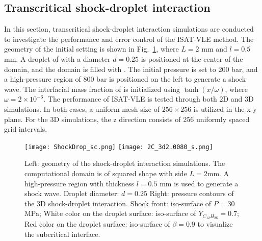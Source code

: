 \subsection{Transcritical shock-droplet interaction}
\label{sec:SD}

In this section, transcritical shock-droplet interaction simulations are conducted to investigate the performance and error control of the ISAT-VLE method. The geometry of the initial setting is shown in Fig.~\ref{SD_GEO}, where $L=2$ mm and $l=0.5$ mm. A droplet of  with a diameter $d=0.25$ is positioned at the center of the domain, and the domain is filled with . The initial pressure is set to 200 bar, and a high-pressure region of 800 bar is positioned on the left to generate a shock wave. The interfacial mass fraction of  is initialized using $\tanh(x/\omega)$, where $\omega=2 \times 10^{-6}$. The performance of ISAT-VLE is tested through both 2D and 3D simulations. In both cases, a uniform mesh size of $256\times256$ is utilized in the x-y plane. For the 3D simulations, the z direction consists of 256 uniformly spaced grid intervals. 


\begin{figure}[htbp]
\centering
\texttt{[image: ShockDrop\_sc.png]}
\hspace{.7in}
\texttt{[image: 2C\_3d2.0080\_s.png]}
\caption{Left: geometry of the shock-droplet interaction simulations. The computational domain is of squared shape with side $L=2$mm. A high-pressure region with thickness $l=0.5$ mm is used to generate a shock wave. Droplet diameter: $d=0.25$ Right: pressure contours of the 3D shock-droplet interaction. Shock front: iso-surface of $P=30$ MPa; White color on the droplet surface: iso-surface of $Y_{C_{12}H_{26}}=0.7$; Red color on the droplet surface: iso-surface of $\beta =0.9$ to visualize the subcritical interface.}
\label{SD_GEO} 
\end{figure}

